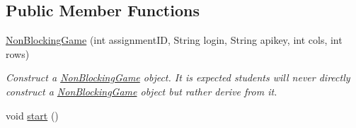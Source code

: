\subsection*{Public Member Functions}
\begin{DoxyCompactItemize}
\item 
\hyperlink{classbridges_1_1games_1_1_non_blocking_game_ae85ea8dcc355372ba354f4e26323fb76}{Non\+Blocking\+Game} (int assignment\+ID, String login, String apikey, int cols, int rows)
\begin{DoxyCompactList}\small\item\em Construct a \hyperlink{classbridges_1_1games_1_1_non_blocking_game}{Non\+Blocking\+Game} object. It is expected students will never directly construct a \hyperlink{classbridges_1_1games_1_1_non_blocking_game}{Non\+Blocking\+Game} object but rather derive from it. \end{DoxyCompactList}\item 
void \hyperlink{classbridges_1_1games_1_1_non_blocking_game_ac4df60691641278f139d138c7347674a}{start} ()
\end{DoxyCompactItemize}
